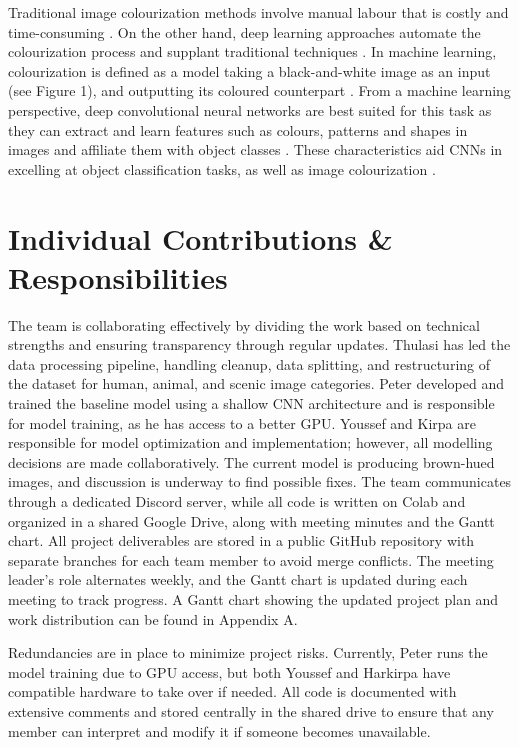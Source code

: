 \documentclass{article} %
\begin{document}
Traditional image colourization methods involve manual labour that is costly and time-consuming \citep{farella2022}. On the other hand, deep learning approaches automate the colourization process and supplant traditional techniques \citep{farella2022}. In machine learning, colourization is defined as a model taking a black-and-white image as an input (see Figure 1), and outputting its coloured counterpart \citep{lettherebecolour}. From a machine learning perspective, deep convolutional neural networks are best suited for this task as they can extract and learn features such as colours, patterns and shapes in images and affiliate them with object classes \citep{deepcnn}. These characteristics aid CNNs in excelling at object classification tasks, as well as image colourization \citep{deepcnn}. 

\section{Individual Contributions \& Responsibilities}
The team is collaborating effectively by dividing the work based on technical strengths and ensuring transparency through regular updates. Thulasi has led the data processing pipeline, 
handling cleanup, data splitting, and restructuring of the dataset for human, animal, and scenic image categories. Peter developed and trained the baseline model using a shallow CNN architecture 
and is responsible for model training, as he has access to a better GPU. Youssef and Kirpa are responsible for model optimization and implementation; however, all modelling decisions are made collaboratively. 
The current model is producing brown-hued images, and discussion is underway to find possible fixes. The team communicates through a dedicated Discord server, while all code is written on Colab and organized 
in a shared Google Drive, along with meeting minutes and the Gantt chart. All project deliverables are stored in a public GitHub repository with separate branches for each team member to avoid merge conflicts. 
The meeting leader's role alternates weekly, and the Gantt chart is updated during each meeting to track progress. A Gantt chart showing the updated project plan and work distribution can be found in Appendix A.

Redundancies are in place to minimize project risks. Currently, Peter runs the model training due to GPU access, but both Youssef and Harkirpa have compatible hardware to take over if needed. All code is documented 
with extensive comments and stored centrally in the shared drive to ensure that any member can interpret and modify it if someone becomes unavailable.
\end{document}
